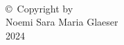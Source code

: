 
\thispagestyle{empty}
\hbox{\ }

\vfill

\vspace{.5in}

\begin{center}
\large{\copyright \hbox{ }Copyright by\\
Noemi Sara Maria Glaeser  %
\\
2024}
\end{center}

\vfill

